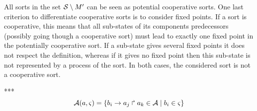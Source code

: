 All sorts in the set $\mathcal{S} \setminus M'$ can be seen as potential cooperative sorts. One last criterion to differentiate cooperative sorts is to consider fixed points. If a sort is cooperative, this means that all sub-states of its components predecessors (possibly going though a cooperative sort) must lead to exactly one fixed point in the potentially cooperative sort. If a sub-state gives several fixed points it does not respect the definition, whereas if it gives no fixed point then this sub-state is not represented by a process of the sort. In both cases, the considered sort is not a cooperative sort.

***
\begin{equation}
\mathcal A(a, \varsigma) = \{ \PHfrappe{b_i}{a_j}{a_k} \in \mathcal A \mid 
	b_i \in \varsigma \} %
\label{eq:Actx}
\end{equation}


